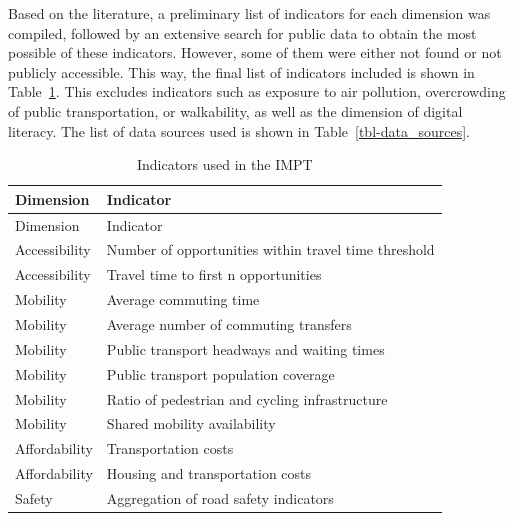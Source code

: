 \documentclass[
  authoryear,
  review,
  1p]{elsarticle}
\begin{document}
Based on the literature, a preliminary list of indicators for each
dimension was compiled, followed by an extensive search for public data
to obtain the most possible of these indicators. However, some of them
were either not found or not publicly accessible. This way, the final
list of indicators included is shown in Table~\ref{tbl-all_indicators}.
This excludes indicators such as exposure to air pollution, overcrowding
of public transportation, or walkability, as well as the dimension of
digital literacy. The list of data sources used is shown in
Table~\ref{tbl-data_sources}.

\begin{longtable}[]{@{}ll@{}}
\caption{Indicators used in the
IMPT}\label{tbl-all_indicators}\tabularnewline
\toprule\noalign{}
Dimension & Indicator \\
\midrule\noalign{}
\endfirsthead
\toprule\noalign{}
Dimension & Indicator \\
\midrule\noalign{}
\endhead
\bottomrule\noalign{}
\endlastfoot
Accessibility & Number of opportunities within travel time threshold \\
Accessibility & Travel time to first n opportunities \\
Mobility & Average commuting time \\
Mobility & Average number of commuting transfers \\
Mobility & Public transport headways and waiting times \\
Mobility & Public transport population coverage \\
Mobility & Ratio of pedestrian and cycling infrastructure \\
Mobility & Shared mobility availability \\
Affordability & Transportation costs \\
Affordability & Housing and transportation costs \\
Safety & Aggregation of road safety indicators \\
\end{longtable}
\end{document}
